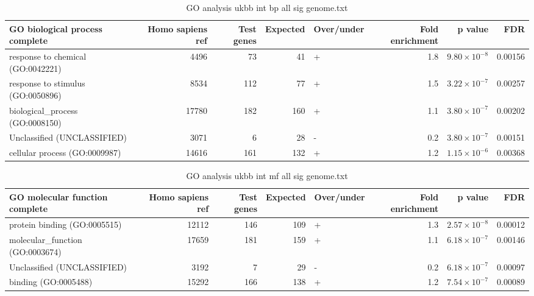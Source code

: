 \begin{table}[ht]
\centering
\begin{adjustbox}{width=\textwidth}
\begin{tabular}{lrrrlrrr}
  \hline
GO biological process complete & Homo sapiens ref & Test genes & Expected & Over/under & Fold enrichment & p value & FDR \\ 
  \hline
response to chemical (GO:0042221) & 4496 & 73 & 41 & + & 1.8 & $9.80 \times 10^{-8}$ & 0.00156 \\ 
  response to stimulus (GO:0050896) & 8534 & 112 & 77 & + & 1.5 & $3.22 \times 10^{-7}$ & 0.00257 \\ 
  biological\_process (GO:0008150) & 17780 & 182 & 160 & + & 1.1 & $3.80 \times 10^{-7}$ & 0.00202 \\ 
  Unclassified (UNCLASSIFIED) & 3071 & 6 & 28 & - & 0.2 & $3.80 \times 10^{-7}$ & 0.00151 \\ 
  cellular process (GO:0009987) & 14616 & 161 & 132 & + & 1.2 & $1.15 \times 10^{-6}$ & 0.00368 \\ 
   \hline
\end{tabular}
\end{adjustbox}
\caption{GO analysis ukbb int bp all sig genome.txt} 
\label{tab:GO analysis ukbb_int_bp_all_sig_genome.txt}
\end{table}




\begin{table}[ht]
\centering
\begin{adjustbox}{width=\textwidth}
\begin{tabular}{lrrrlrrr}
  \hline
GO molecular function complete & Homo sapiens ref & Test genes & Expected & Over/under & Fold enrichment & p value & FDR \\ 
  \hline
protein binding (GO:0005515) & 12112 & 146 & 109 & + & 1.3 & $2.57 \times 10^{-8}$ & 0.00012 \\ 
  molecular\_function (GO:0003674) & 17659 & 181 & 159 & + & 1.1 & $6.18 \times 10^{-7}$ & 0.00146 \\ 
  Unclassified (UNCLASSIFIED) & 3192 & 7 & 29 & - & 0.2 & $6.18 \times 10^{-7}$ & 0.00097 \\ 
  binding (GO:0005488) & 15292 & 166 & 138 & + & 1.2 & $7.54 \times 10^{-7}$ & 0.00089 \\ 
   \hline
\end{tabular}
\end{adjustbox}
\caption{GO analysis ukbb int mf all sig genome.txt} 
\label{tab:GO analysis ukbb_int_mf_all_sig_genome.txt}
\end{table}



